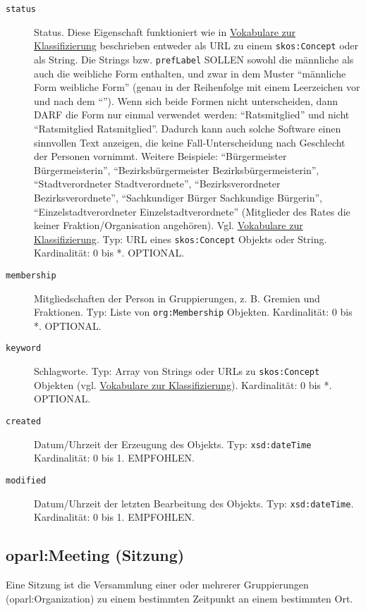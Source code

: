 \documentclass[,a4paper]{article}
\begin{document}
\begin{description}
\item[\texttt{status}]
Status. Diese Eigenschaft funktioniert wie in
\hyperref[vokabulareux5fklassifizierung]{Vokabulare zur Klassifizierung}
beschrieben entweder als URL zu einem \texttt{skos:Concept} oder als
String. Die Strings bzw. \texttt{prefLabel} SOLLEN sowohl die männliche
als auch die weibliche Form enthalten, und zwar in dem Muster
``männliche Form \textbar{} weibliche Form'' (genau in der Reihenfolge
mit einem Leerzeichen vor und nach dem ``\textbar{}''). Wenn sich beide
Formen nicht unterscheiden, dann DARF die Form nur einmal verwendet
werden: ``Ratsmitglied'' und nicht ``Ratsmitglied \textbar{}
Ratsmitglied''. Dadurch kann auch solche Software einen sinnvollen Text
anzeigen, die keine Fall-Unterscheidung nach Geschlecht der Personen
vornimmt. Weitere Beispiele: ``Bürgermeister \textbar{}
Bürgermeisterin'', ``Bezirksbürgermeister \textbar{}
Bezirksbürgermeisterin'', ``Stadtverordneter \textbar{}
Stadtverordnete'', ``Bezirksverordneter \textbar{} Bezirksverordnete'',
``Sachkundiger Bürger \textbar{} Sachkundige Bürgerin'',
``Einzelstadtverordneter \textbar{} Einzelstadtverordnete'' (Mitglieder
des Rates die keiner Fraktion/Organisation angehören). Vgl.
\hyperref[vokabulareux5fklassifizierung]{Vokabulare zur
Klassifizierung}. Typ: URL eines \texttt{skos:Concept} Objekts oder
String. Kardinalität: 0 bis *. OPTIONAL.
\item[\texttt{membership}]
Mitgliedschaften der Person in Gruppierungen, z. B. Gremien und
Fraktionen. Typ: Liste von \texttt{org:Membership} Objekten.
Kardinalität: 0 bis *. OPTIONAL.
\item[\texttt{keyword}]
Schlagworte. Typ: Array von Strings oder URLs zu \texttt{skos:Concept}
Objekten (vgl. \hyperref[vokabulareux5fklassifizierung]{Vokabulare zur
Klassifizierung}). Kardinalität: 0 bis *. OPTIONAL.
\item[\texttt{created}]
Datum/Uhrzeit der Erzeugung des Objekts. Typ: \texttt{xsd:dateTime}
Kardinalität: 0 bis 1. EMPFOHLEN.
\item[\texttt{modified}]
Datum/Uhrzeit der letzten Bearbeitung des Objekts. Typ:
\texttt{xsd:dateTime}. Kardinalität: 0 bis 1. EMPFOHLEN.
\end{description}

\subsection{oparl:Meeting (Sitzung)}\label{oparlux5fmeeting}

Eine Sitzung ist die Versammlung einer oder mehrerer Gruppierungen
(oparl:Organization) zu einem bestimmten Zeitpunkt an einem bestimmten
Ort.
\end{document}
